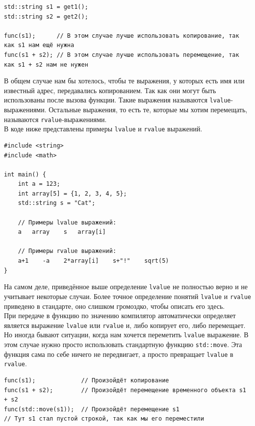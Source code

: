 \documentclass{article}
\begin{document}
\begin{lstlisting}
std::string s1 = get1();
std::string s2 = get2();

func(s1);      // В этом случае лучше использовать копирование, так как s1 нам ещё нужна
func(s1 + s2); // В этом случае лучше использовать перемещение, так как s1 + s2 нам не нужен
\end{lstlisting}
В общем случае нам бы хотелось, чтобы те выражения, у которых есть имя или известный адрес, передавались копированием. Так как они могут быть использованы после вызова функции. Такие выражения называются \texttt{lvalue}-выражениями. Остальные выражения, то есть те, которые мы хотим перемещать, называются \texttt{rvalue}-выражениями.\\



В коде ниже представлены примеры \texttt{lvalue} и \texttt{rvalue} выражений.

\begin{lstlisting}
#include <string>
#include <math>

int main() {
    int a = 123;
    int array[5] = {1, 2, 3, 4, 5};
    std::string s = "Cat";
    
    // Примеры lvalue выражений:
    a   array    s   array[i]  
    
    // Примеры rvalue выражений:
    a+1    -a    2*array[i]    s+"!"    sqrt(5)
}
\end{lstlisting}

На самом деле, приведённое выше определение \texttt{lvalue} не полностью верно и не учитывает некоторые случаи. Более точное определение понятий \texttt{lvalue} и \texttt{rvalue} приведено в стандарте, оно слишком громоздко, чтобы описать его здесь.\\

При передаче в функцию по значению компилятор автоматически определяет является выражение \texttt{lvalue} или \texttt{rvalue} и, либо копирует его, либо перемещает. Но иногда бывают ситуации, когда нам хочется переметить \texttt{lvalue} выражение. В этом случае нужно просто использовать стандартную функцию \texttt{std::move}. Эта функция сама по себе ничего не передвигает, а просто превращает \texttt{lvalue} в \texttt{rvalue}.
\begin{lstlisting}
func(s1);             // Произойдёт копирование
func(s1 + s2);        // Произойдёт перемещение временного объекта s1 + s2
func(std::move(s1));  // Произойдёт перемещение s1
// Тут s1 стал пустой строкой, так как мы его переместили
\end{lstlisting}
\end{document}
